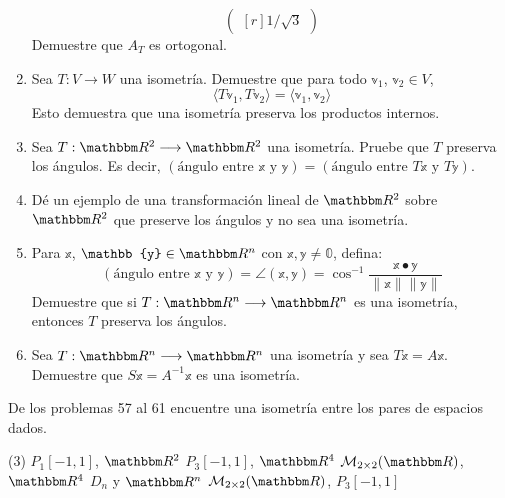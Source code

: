 \begin{enumerate}[start=27]
$$\begin{pmatrix*}[r]
        1/\sqrt{3}
    \end{pmatrix*}$$
    Demuestre que $A_{T}$ es ortogonal.
    \item Sea $T: V \longrightarrow W$ una isometría. Demuestre que para todo $\mathbb{v}_1$, $\mathbb{v}_2 \in V$,
    $$\langle T\mathbb{v}_1, T\mathbb{v}_2 \rangle = \langle \mathbb{v}_1, \mathbb{v}_2 \rangle$$
    Esto demuestra que una isometría preserva los productos internos.
    \item Sea $T: \RR[2] \longrightarrow \RR[2]$ una isometría. Pruebe que $T$ preserva los ángulos. Es decir, $(\text{ángulo entre } \mathbb{x} \text{ y } \mathbb{y}) = (\text{ángulo entre } T \mathbb{x} \text{ y } T \mathbb{y})$.
    \item Dé un ejemplo de una transformación lineal de $\RR[2]$ sobre $\RR[2]$ que preserve los ángulos y no sea una isometría.
    \item Para $\mathbb{x}$, $\mathbb{y} \in \RR[n]$ con $\mathbb{x}, \mathbb{y} \neq \mathbb{0}$, defina:
    $$(\text{ángulo entre } \mathbb{x} \text{ y } \mathbb{y}) = \angle (\mathbb{x}, \mathbb{y}) = \cos ^{-1} \frac{\mathbb{x} \bullet \mathbb{y}}{\| \mathbb{x} \| \| \mathbb{y} \|}$$
    Demuestre que si $T: \RR[n] \longrightarrow \RR[n]$ es una isometría, entonces $T$ preserva los ángulos.
    \item Sea $T: \RR[n] \longrightarrow \RR[n]$ una isometría y sea $T \mathbb{x}=A \mathbb{x}$. Demuestre que $S \mathbb{x}=A^{-1} \mathbb{x}$ es una isometría.
\end{enumerate}
De los problemas 57 al 61 encuentre una isometría entre los pares de espacios dados.
\begin{tasks}[
    start=57,
    style=enumerate,
    label-offset = 3mm,
    ](3)
    \task $P_{1}[-1,1]$, $\RR[2]$
    \task $P_{3}[-1,1]$, $\RR[4]$
    \task $\mathcal{M}_{2 \times 2}(\RR)$, $\RR[4]$
    \task $D_{n}$ y $\RR[n]$
    \task $\mathcal{M}_{2 \times 2}(\RR)$, $P_{3}[-1,1]$
\end{tasks}
